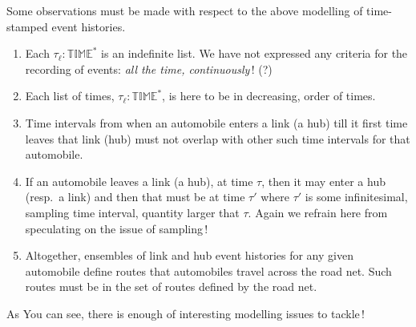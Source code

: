 {\noindent
\begynd
\pind Some observations must be made with respect to the above modelling of
      time-stamped event histories.
\afslut
\begin{enumerate}\setei
\item \label{nasa-00750} Each $\tau_{\ell}:\mathbb{TIME}^{\ast}$ is
                         an indefinite list. \nyl We have not expressed any
                         criteria \nyl  for the recording of events:
                         \textsl{all the time, continuously}\,! (?)                          
\item \label{nasa-00755} Each list of times, $\tau_{\ell}:\mathbb{TIME}^{\ast}$,
                         is here to be in decreasing, 
                         order of times.  
\item \label{nasa-00760} Time intervals from when an automobile
                         enters a link (a hub) \nyl  till it first time
                         leaves that link (hub) \nyl  must not overlap with
                         other such time intervals for that
                         automobile. 
\item \label{nasa-00765} If an automobile leaves a link (a hub), at time
                         $\tau$, then it may enter a hub (resp.\ a
                         link)  \nyl and then that must be at time $\tau'$ \nyl 
                         where  $\tau'$ is some infinitesimal,
                         sampling time interval, quantity
                         larger that $\tau$. \nyl  Again we refrain here
                         from speculating on the issue of sampling\,!
\item \label{nasa-00770} Altogether, ensembles of link and hub
                         event histories \nyl  for any given automobile
                         define routes that automobiles travel across
                         the road net. \nyl  Such routes must be in the set
                         of routes defined by the road net.


  


\savei\end{enumerate}
\noindent
\begynd
\pind As You can see, there is enough of interesting modelling issues
to tackle\,!
\afslut
\mnewfoil

\pos{\vspace*{2mm}}{}
 
\LLLL

}

